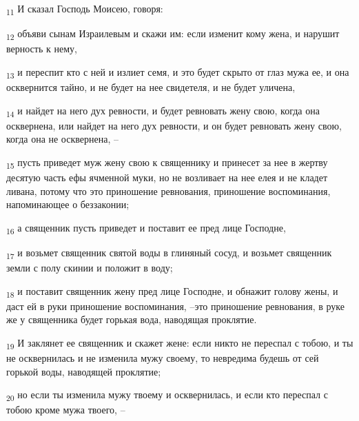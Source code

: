 \begin{tcolorbox}
\textsubscript{11} И сказал Господь Моисею, говоря:
\end{tcolorbox}
\begin{tcolorbox}
\textsubscript{12} объяви сынам Израилевым и скажи им: если изменит кому жена, и нарушит верность к нему,
\end{tcolorbox}
\begin{tcolorbox}
\textsubscript{13} и переспит кто с ней и излиет семя, и это будет скрыто от глаз мужа ее, и она осквернится тайно, и не будет на нее свидетеля, и не будет уличена,
\end{tcolorbox}
\begin{tcolorbox}
\textsubscript{14} и найдет на него дух ревности, и будет ревновать жену свою, когда она осквернена, или найдет на него дух ревности, и он будет ревновать жену свою, когда она не осквернена, --
\end{tcolorbox}
\begin{tcolorbox}
\textsubscript{15} пусть приведет муж жену свою к священнику и принесет за нее в жертву десятую часть ефы ячменной муки, но не возливает на нее елея и не кладет ливана, потому что это приношение ревнования, приношение воспоминания, напоминающее о беззаконии;
\end{tcolorbox}
\begin{tcolorbox}
\textsubscript{16} а священник пусть приведет и поставит ее пред лице Господне,
\end{tcolorbox}
\begin{tcolorbox}
\textsubscript{17} и возьмет священник святой воды в глиняный сосуд, и возьмет священник земли с полу скинии и положит в воду;
\end{tcolorbox}
\begin{tcolorbox}
\textsubscript{18} и поставит священник жену пред лице Господне, и обнажит голову жены, и даст ей в руки приношение воспоминания, --это приношение ревнования, в руке же у священника будет горькая вода, наводящая проклятие.
\end{tcolorbox}
\begin{tcolorbox}
\textsubscript{19} И заклянет ее священник и скажет жене: если никто не переспал с тобою, и ты не осквернилась и не изменила мужу своему, то невредима будешь от сей горькой воды, наводящей проклятие;
\end{tcolorbox}
\begin{tcolorbox}
\textsubscript{20} но если ты изменила мужу твоему и осквернилась, и если кто переспал с тобою кроме мужа твоего, --
\end{tcolorbox}
